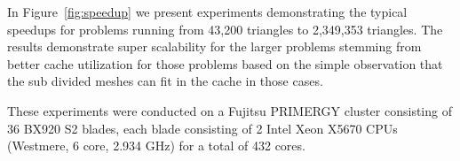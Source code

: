 \documentclass{manual}
\begin{document}
In Figure~\ref{fig:speedup} we present experiments demonstrating the typical speedups for problems running from 43,200 triangles to 2,349,353 triangles. The results demonstrate super scalability for the larger problems stemming from better cache utilization for those problems based on the simple observation that the sub divided meshes can fit in the cache in those cases.

These experiments were conducted on a Fujitsu PRIMERGY cluster consisting of 36 BX920 S2 blades, each blade consisting of 2 Intel Xeon X5670 CPUs
(Westmere, 6 core, 2.934 GHz) for a total of 432 cores.



%
\end{document}
